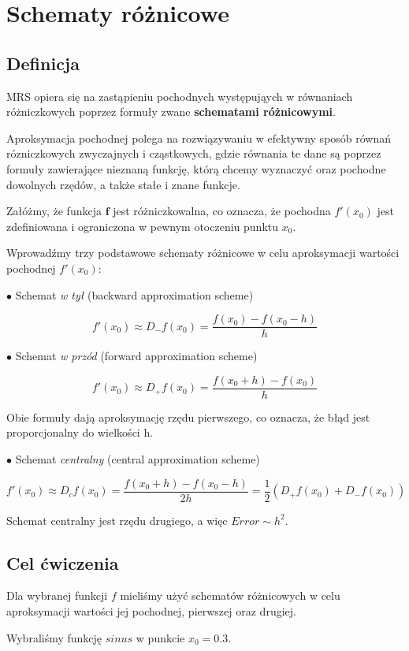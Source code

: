 \section{Schematy różnicowe}
\subsection{Definicja}

MRS opiera się na zastąpieniu pochodnych występująych w równaniach różniczkowych poprzez formuły zwane \textbf{schematami różnicowymi}. 

Aproksymacja pochodnej polega na rozwiązywaniu w efektywny sposób równań rózniczkowych zwyczajnych i cząstkowych, gdzie równania te dane są poprzez formuły zawierające nieznaną funkcję, którą chcemy wyznaczyć oraz pochodne dowolnych rzędów, a także stałe i znane funkcje.

Załóżmy, że funkcja $\textbf{f}$ jest różniczkowalna, co oznacza, że pochodna $f'(x_{0})$ jest zdefiniowana i ograniczona w pewnym otoczeniu punktu $x_{0}$.

Wprowadźmy trzy podstawowe schematy różnicowe w celu aproksymacji wartości pochodnej $f'(x_{0})$:

$\bullet$ Schemat \textit{w tył} (backward approximation scheme) 

$$f'(x_{0})\approx D_{-}f(x_{0})=\frac{f(x_{0})-f(x_{0}-h)}{h}$$

$\bullet$ Schemat \textit{w przód} (forward approximation scheme) 

$$f'(x_{0})\approx D_{+}f(x_{0})=\frac{f(x_{0}+h)-f(x_{0})}{h}$$

Obie formuły dają aproksymację rzędu pierwszego, co oznacza, że błąd jest proporcjonalny do wielkości h.

$\bullet$ Schemat \textit{centralny} (central approximation scheme) 

$$f'(x_{0})\approx D_{c}f(x_{0})=\frac{f(x_{0}+h)-f(x_{0}-h)}{2h} = \frac{1}{2}(D_{+}f(x_{0})+D_{-}f(x_{0}))$$

Schemat centralny jest rzędu drugiego, a więc $Error \sim h^{2}$.

	\subsection{Cel ćwiczenia}
Dla wybranej funkcji $f$ mieliśmy użyć schematów różnicowych w celu aproksymacji wartości jej pochodnej, pierwszej oraz drugiej.

Wybraliśmy funkcję $sinus$ w punkcie $x_{0} = 0.3$.

